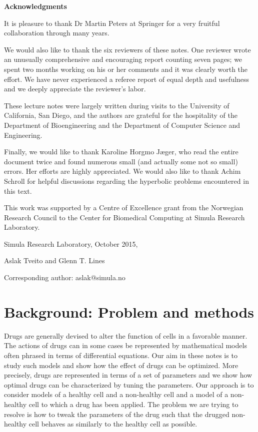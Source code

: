 \bigskip
\bigskip

{\bf Acknowledgments}

\bigskip

It is pleasure to thank Dr Martin Peters at Springer for a very fruitful collaboration through many years.

We would also like to thank the six reviewers of these notes. One reviewer wrote an unusually comprehensive and encouraging report counting seven pages; we spent two months working on his or her comments and it was clearly worth the effort. We have never experienced a referee report of equal depth and usefulness and we deeply appreciate the reviewer's labor.

These lecture notes were largely written during visits to the University of California, San Diego, and the authors are grateful for the hospitality of the Department of Bioengineering and the Department of Computer Science and Engineering.

Finally, we would like to thank Karoline Horgmo J\ae ger, who read the entire document twice and found numerous small (and actually some not so small) errors. Her efforts are highly appreciated. We would also like to thank Achim Schroll for helpful discussions regarding the hyperbolic problems encountered in this text.

This work was supported by a Centre of Excellence grant from the Norwegian Research Council to the Center for Biomedical Computing at Simula Research Laboratory.

\bigskip
\bigskip

Simula Research Laboratory, October 2015,

\bigskip


Aslak Tveito and Glenn T. Lines

\bigskip
\bigskip

Corresponding author: aslak@simula.no



\chapter{Background: Problem and methods}
\label{Background}

Drugs are generally devised to alter the function of cells in a favorable manner. The actions of drugs can in some cases be represented by mathematical models often phrased in terms of differential equations. Our aim in these notes is to study such models and show how the effect of drugs can be optimized. More precisely, drugs are represented in terms of a set of parameters and we show how optimal drugs can be characterized by tuning the parameters. Our approach is to consider models of a healthy cell and a non-healthy cell and a model of a non-healthy cell to which a drug has been applied. The problem we are trying to resolve is how to tweak the parameters of the drug such that the drugged non-healthy cell behaves as similarly to the healthy cell as possible.

